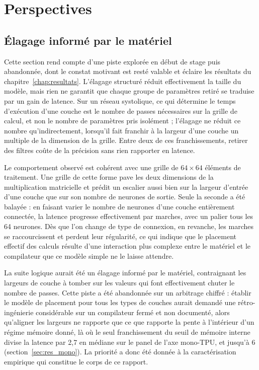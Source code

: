 \documentclass[11pt,a4paper]{report}
\begin{document}
\chapter{Perspectives}
\label{chap:perspectives}

\section{Élagage informé par le matériel}

Cette section rend compte d'une piste explorée en début de stage puis abandonnée, dont le constat motivant est resté valable et éclaire les résultats du chapitre~\ref{chap:resultats}. L'élagage structuré réduit effectivement la taille du modèle, mais rien ne garantit que chaque groupe de paramètres retiré se traduise par un gain de latence. Sur un réseau systolique, ce qui détermine le temps d'exécution d'une couche est le nombre de passes nécessaires sur la grille de calcul, et non le nombre de paramètres pris isolément ; l'élagage ne réduit ce nombre qu'indirectement, lorsqu'il fait franchir à la largeur d'une couche un multiple de la dimension de la grille. Entre deux de ces franchissements, retirer des filtres coûte de la précision sans rien rapporter en latence.

Le comportement observé est cohérent avec une grille de $64 \times 64$ éléments de traitement. Une grille de cette forme pave les deux dimensions de la multiplication matricielle et prédit un escalier aussi bien sur la largeur d'entrée d'une couche que sur son nombre de neurones de sortie. Seule la seconde a été balayée : en faisant varier le nombre de neurones d'une couche entièrement connectée, la latence progresse effectivement par marches, avec un palier tous les 64 neurones. Dès que l'on change de type de connexion, en revanche, les marches se raccourcissent et perdent leur régularité, ce qui indique que le placement effectif des calculs résulte d'une interaction plus complexe entre le matériel et le compilateur que ce modèle simple ne le laisse attendre.

La suite logique aurait été un élagage informé par le matériel, contraignant les largeurs de couche à tomber sur les valeurs qui font effectivement chuter le nombre de passes. Cette piste a été abandonnée sur un arbitrage chiffré : établir le modèle de placement pour tous les types de couches aurait demandé une rétro-ingénierie considérable sur un compilateur fermé et non documenté, alors qu'aligner les largeurs ne rapporte que ce que rapporte la pente à l'intérieur d'un régime mémoire donné, là où le seul franchissement du seuil de mémoire interne divise la latence par 2,7 en médiane sur le panel de l'axe mono-TPU, et jusqu'à 6 (section~\ref{sec:res_mono}). La priorité a donc été donnée à la caractérisation empirique qui constitue le corps de ce rapport.
\end{document}
